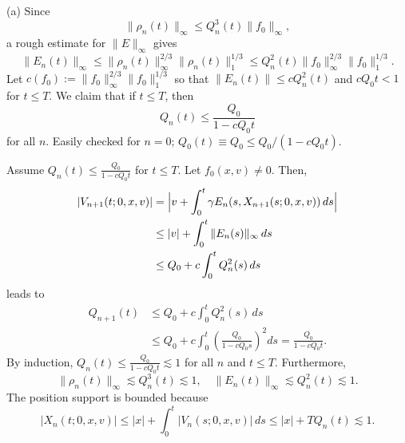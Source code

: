 \documentclass[12pt]{article}
\begin{document}
\begin{pf}
(a)
Since
\[\|\rho_n(t)\|_\infty\le Q_n^3(t)\|f_0\|_\infty,\]
a rough estimate for $\|E\|_\infty$ gives
\[\|E_n(t)\|_\infty\le\|\rho_n(t)\|_\infty^{2/3}\|\rho_n(t)\|_1^{1/3}\le Q_n^2(t)\|f_0\|_\infty^{2/3}\|f_0\|_1^{1/3}.\]
Let $c(f_0):=\|f_0\|_\infty^{2/3}\|f_0\|_1^{1/3}$ so that $\|E_n(t)\|\le cQ_n^2(t)$ and $cQ_0t<1$ for $t\le T$.
We claim that if $t\le T$, then
\[Q_n(t)\le\frac{Q_0}{1-cQ_0t}\]
for all $n$.
Easily checked for $n=0$; $Q_0(t)\equiv Q_0\le Q_0/(1-cQ_0t)$.

Assume $Q_n(t)\le\frac{Q_0}{1-cQ_0t}$ for $t\le T$.
Let $f_0(x,v)\ne0$.
Then,
\begin{align*}
|V_{n+1}(t;0,x,v)|
&=\Bigl|v+\int_0^t\gamma E_n(s,X_{n+1}(s;0,x,v))\,ds\Bigr|\\
&\le|v|+\int_0^t\|E_n(s)\|_\infty\,ds\\
&\le Q_0+c\int_0^tQ_n^2(s)\,ds
\end{align*}
leads to
\begin{align*}
Q_{n+1}(t)
&\le Q_0+c\int_0^tQ_n^2(s)\,ds\\
&\le Q_0+c\int_0^t\left(\frac{Q_0}{1-cQ_0s}\right)^2ds
=\frac{Q_0}{1-cQ_0t}.
\end{align*}
By induction, $Q_n(t)\le\frac{Q_0}{1-cQ_0t}\lesssim1$ for all $n$ and $t\le T$.
Furthermore,
\[\|\rho_n(t)\|_\infty\lesssim Q_n^3(t)\lesssim1,\quad\|E_n(t)\|_\infty\lesssim Q_n^2(t)\lesssim1.\]
The position support is bounded because
\[|X_n(t;0,x,v)|\le|x|+\int_0^t|V_n(s;0,x,v)|\,ds\le|x|+TQ_n(t)\lesssim1.\]


\end{pf}
\end{document}
